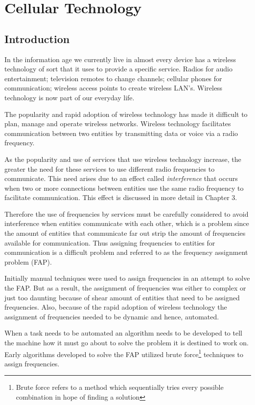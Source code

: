 \chapter{Cellular Technology}
\label{chpt:celltech}
\section{Introduction}
In the information age we currently live in almost every device has a wireless technology of sort that it uses to provide a specific service. Radios for audio entertainment; television remotes to change
channels; cellular phones for communication; wireless access points to create wireless LAN's\cite{Karen2004}. Wireless technology is now part of our everyday life.

The popularity and rapid adoption of wireless technology has made it difficult to plan, manage and operate wireless networks. Wireless technology facilitates communication between two entities by transmitting data or voice via a radio frequency. 

As the popularity and use of services that use wireless technology increase, the greater the need for these services to use different radio frequencies to communicate. This need arises due to an effect called \emph{interference} that occurs when two or more connections between entities use the same radio frequency to facilitate communication. This effect is discussed in more detail in Chapter 3.

Therefore the use of frequencies by services must be carefully considered to avoid interference when entities communicate with each other, which is a problem since the amount of entities that communicate far out strip the amount of frequencies available for communication. Thus assigning frequencies to entities for communication is a difficult problem and referred to as the frequency assignment problem (FAP).

Initially manual techniques were used to assign frequencies in an attempt to solve the FAP. But as a result, the assignment of frequencies was either to complex or just too daunting because of shear amount of entities that need to be assigned frequencies. Also, because of the rapid adoption of wireless technology the assignment of frequencies needed to be dynamic and hence, automated.

When a task needs to be automated an algorithm needs to be developed to tell the machine how it must go about to solve the problem it is destined to work on. Early algorithms developed to solve the FAP utilized brute force\footnote{Brute force refers to a method which sequentially tries every possible combination in hope of finding a solution} techniques to assign frequencies.


